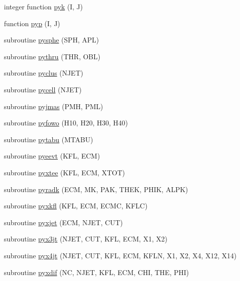 \begin{DoxyCompactItemize}
\item 
integer function \hyperlink{pythia-6_84_824_8f_ac6c322b0c629a97954c1221c422609e7}{pyk} (I, J)
\item 
function \hyperlink{pythia-6_84_824_8f_a6cee1eea51c820d9e90932c9eca205b7}{pyp} (I, J)
\item 
subroutine \hyperlink{pythia-6_84_824_8f_ab34dcd0761aa566123f75cfdfb7c752b}{pysphe} (S\+P\+H, A\+P\+L)
\item 
subroutine \hyperlink{pythia-6_84_824_8f_ab33021ba4e1530eaf22726fa027d1f24}{pythru} (T\+H\+R, O\+B\+L)
\item 
subroutine \hyperlink{pythia-6_84_824_8f_ac823bfab0c9338203123a1cab68ea330}{pyclus} (N\+J\+E\+T)
\item 
subroutine \hyperlink{pythia-6_84_824_8f_abe45dc5a53d53b489813ee6668dfe0b5}{pycell} (N\+J\+E\+T)
\item 
subroutine \hyperlink{pythia-6_84_824_8f_a025d8a525c7023066fc3aad781f71e75}{pyjmas} (P\+M\+H, P\+M\+L)
\item 
subroutine \hyperlink{pythia-6_84_824_8f_abf7b5cfdcfaac6f5a57ac9bdfff6e358}{pyfowo} (H10, H20, H30, H40)
\item 
subroutine \hyperlink{pythia-6_84_824_8f_a02f810199db68652d080388e3896d4e9}{pytabu} (M\+T\+A\+B\+U)
\item 
subroutine \hyperlink{pythia-6_84_824_8f_a1fe450158e5c936ef62425c893c69513}{pyeevt} (K\+F\+L, E\+C\+M)
\item 
subroutine \hyperlink{pythia-6_84_824_8f_a4b38df740bd8c59b191db239bf48816c}{pyxtee} (K\+F\+L, E\+C\+M, X\+T\+O\+T)
\item 
subroutine \hyperlink{pythia-6_84_824_8f_a455431db0addafd011f197bca0289258}{pyradk} (E\+C\+M, M\+K, P\+A\+K, T\+H\+E\+K, P\+H\+I\+K, A\+L\+P\+K)
\item 
subroutine \hyperlink{pythia-6_84_824_8f_aab51a2a10eef9abc6a2acc8d16c62604}{pyxkfl} (K\+F\+L, E\+C\+M, E\+C\+M\+C, K\+F\+L\+C)
\item 
subroutine \hyperlink{pythia-6_84_824_8f_acaa9b0dacb1d573f221e375e29d705c0}{pyxjet} (E\+C\+M, N\+J\+E\+T, C\+U\+T)
\item 
subroutine \hyperlink{pythia-6_84_824_8f_abab2a3f9f28eb5eca8f8a75190e6113f}{pyx3jt} (N\+J\+E\+T, C\+U\+T, K\+F\+L, E\+C\+M, X1, X2)
\item 
subroutine \hyperlink{pythia-6_84_824_8f_a3d8e2097368a69d1101835198fe12cba}{pyx4jt} (N\+J\+E\+T, C\+U\+T, K\+F\+L, E\+C\+M, K\+F\+L\+N, X1, X2, X4, X12, X14)
\item 
subroutine \hyperlink{pythia-6_84_824_8f_a8c4e67bd02e0c6e202fd31548c976419}{pyxdif} (N\+C, N\+J\+E\+T, K\+F\+L, E\+C\+M, C\+H\+I, T\+H\+E, P\+H\+I)

\end{DoxyCompactItemize}
